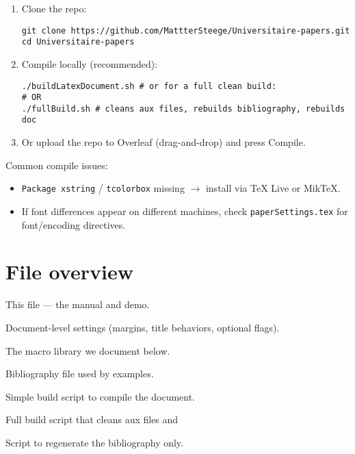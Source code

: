\documentclass[nonacm, sigconf, balance=true]{acmart}
\begin{document}
    \begin{enumerate}
        \item Clone the repo:
        \begin{verbatim}
git clone https://github.com/MattterSteege/Universitaire-papers.git
cd Universitaire-papers
        \end{verbatim}

        \item Compile locally (recommended):
        \begin{verbatim}
./buildLatexDocument.sh # or for a full clean build:
# OR
./fullBuild.sh # cleans aux files, rebuilds bibliography, rebuilds doc
        \end{verbatim}

        \item Or upload the repo to Overleaf (drag-and-drop) and press Compile.
    \end{enumerate}

    Common compile issues:
    \begin{itemize}
        \item \texttt{Package xstring} / \texttt{tcolorbox} missing $\to$ install via TeX Live or MikTeX.
        \item If font differences appear on different machines, check \texttt{paperSettings.tex} for font/encoding directives.
    \end{itemize}



    \section{File overview}
    \begin{description}[leftmargin=!,labelwidth=3.5cm]
        \item[\texttt{main.tex}] This file — the manual and demo.
        \item[\texttt{paperSettings.tex}] Document-level settings (margins, title behaviors, optional flags).
        \item[\texttt{standardCommands.tex}] The macro library we document below.
        \item[\texttt{main.bib}] Bibliography file used by examples.
        \item[\texttt{buildLatexDocument.sh}] Simple build script to compile the document.
        \item[\texttt{fullBuild.sh}] Full build script that cleans aux files and
        \item[\texttt{renewBibliography.sh}] Script to regenerate the bibliography only.
    \end{description}
\end{document}
